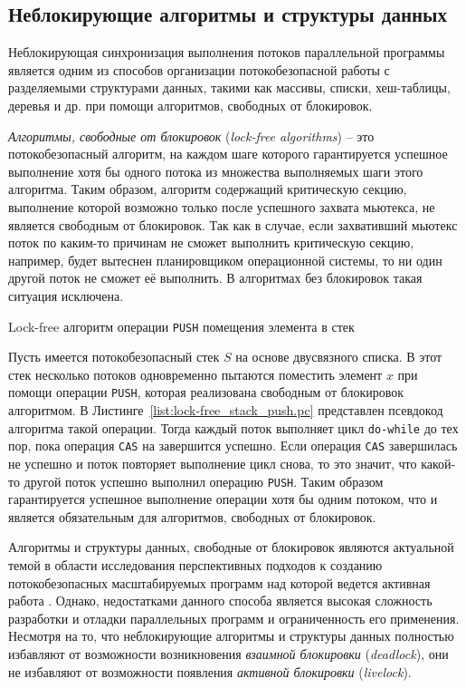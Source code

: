 \subsection{Неблокирующие алгоритмы и структуры данных}
Неблокирующая синхронизация выполнения потоков параллельной программы является одним из способов организации потокобезопасной работы с разделяемыми структурами данных, такими как массивы, списки, хеш-таблицы, деревья и др. при помощи алгоритмов, свободных от блокировок.

\textit{Алгоритмы, свободные от блокировок} (\textit{lock-free algorithms}) -- это потокобезопасный алгоритм, на каждом шаге которого гарантируется успешное выполнение хотя бы одного потока из множества выполняемых шаги этого алгоритма. Таким образом, алгоритм содержащий критическую секцию, выполнение которой возможно только после успешного захвата мьютекса, не является свободным от блокировок. Так как в случае, если захвативший мьютекс поток по каким-то причинам не сможет выполнить критическую секцию, например, будет вытеснен планировщиком операционной системы, то ни один другой поток не сможет её выполнить. В алгоритмах без блокировок такая ситуация исключена.

\begin{algorithm}[!h]
	
    \caption{Lock-free алгоритм операции \texttt{PUSH} помещения элемента в стек}
    \label{list:lock-free_stack_push.pc}
\end{algorithm}

Пусть имеется потокобезопасный стек $S$ на основе двусвязного списка. В этот стек несколько потоков одновременно пытаются поместить элемент $x$ при помощи операции \texttt{PUSH}, которая реализована свободным от блокировок алгоритмом. В Листинге~\ref{list:lock-free_stack_push.pc} представлен псевдокод алгоритма такой операции. Тогда каждый поток выполняет цикл \texttt{do-while} до тех пор, пока операция \texttt{CAS} на завершится успешно. Если операция \texttt{CAS} завершилась не успешно и поток повторяет выполнение цикл снова, то это значит, что какой-то другой поток успешно выполнил операцию \texttt{PUSH}. Таким образом гарантируется успешное выполнение операции хотя бы одним потоком, что и является обязательным для алгоритмов, свободных от блокировок.

Алгоритмы и структуры данных, свободные от блокировок являются актуальной темой в области исследования перспективных подходов к созданию потокобезопасных масштабируемых программ над которой ведется активная работа . Однако, недостатками данного способа является высокая сложность разработки и отладки параллельных программ и ограниченность его применения. Несмотря на то, что неблокирующие алгоритмы и структуры данных полностью избавляют от возможности возникновения \textit{взаимной блокировки} (\textit{deadlock}), они не избавляют от возможности появления \textit{активной блокировки} (\textit{livelock}).


